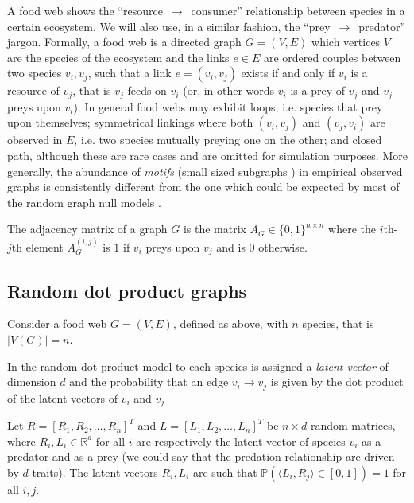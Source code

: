\documentclass[12pt]{article}
\newcommand{\RR}{\mathbb{R}}
\theoremstyle{definition}
\begin{document}
A food web shows the ``resource~$\to$~consumer'' relationship between species in a certain ecosystem. We will also use, in a similar fashion, the  ``prey~$\to$~predator'' jargon. Formally, a food web is a directed graph $G=(V,E)$ which vertices $V$ are the species of the ecosystem and the links $e \in E$ are ordered couples between two species $v_i, v_j$, such that a link $e = (v_i,v_j)$ exists if and only if $v_i$ is a resource of $v_j$, that is $v_j$ feeds on $v_i$ (or, in other words $v_i$ is a prey of $v_j$ and $v_j$ preys upon $v_i$). In general food webs may exhibit loops, i.e. species that prey upon themselves; symmetrical linkings where both $(v_i,v_j)$ and $(v_j,v_i)$ are observed in $E$, i.e. two species mutually preying one on the other; and closed path, although these are rare cases and are omitted for simulation purposes. More generally, the abundance of {\em motifs} (small sized subgraphs \cite{stouffer2005quantitative}) in empirical observed graphs is consistently different from the one which could be expected by most of the random graph null models \cite{stouffer2007evidence}.

The adjacency matrix of a graph $G$ is the matrix $A_G \in \{0,1\}^{n \times n}$ where the $i\mbox{th}$-$j\mbox{th}$ element $A_G^{(i,j)}$ is $1$ if $v_i$ preys upon $v_j$ and is $0$ otherwise.

\subsection{Random dot product graphs}\label{subsec:asge}

Consider a food web $G=(V,E)$, defined as above, with $n$ species, that is $|V(G)| = n$.

In the random dot product model to each species is assigned a {\em latent vector} of dimension $d$ and the probability that an edge $v_i \to v_j$ is given by the dot product of the latent vectors of $v_i$ and $v_j$

Let $R = \left[ R_1, R_2, \dots , R_n \right]^T $ and $L =  \left[ L_1, L_2, \dots , L_n \right]^T$ be $n \times d$ random matrices, where $R_i,L_i \in \RR^d$ for all $i$ are respectively the latent vector of species $v_i$ as a predator and as a prey (we could say that the predation relationship are driven by $d$ traits). The latent vectors $R_i,L_i$ are such that $\mathbb{P}\left( \langle L_i, R_j \rangle \in [0,1] \right) = 1$ for all $i,j$.
\end{document}
